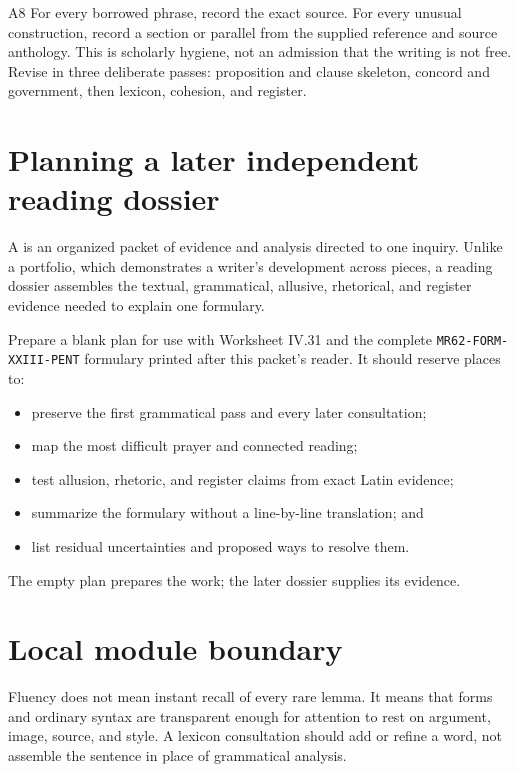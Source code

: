 \begin{courseunit}{A8}
For every borrowed phrase, record the exact source. For every unusual
construction, record a section or parallel from the supplied reference and
source anthology. This is scholarly hygiene, not an admission that the writing
is not free. Revise in three
deliberate passes: proposition and clause skeleton, concord and government,
then lexicon, cohesion, and register.

\section{Planning a later independent reading dossier}

A  is an organized packet of evidence and analysis directed to
one inquiry. Unlike a portfolio, which demonstrates a writer's development
across pieces, a reading dossier assembles the textual, grammatical, allusive,
rhetorical, and register evidence needed to explain one formulary.

Prepare a blank plan for use with Worksheet IV.31 and the complete
\texttt{MR62-FORM-XXIII-PENT} formulary printed after this packet's reader. It
should reserve places
to:

\begin{itemize}
  \item preserve the first grammatical pass and every later consultation;
  \item map the most difficult prayer and connected reading;
  \item test allusion, rhetoric, and register claims from exact Latin evidence;
  \item summarize the formulary without a line-by-line translation; and
  \item list residual uncertainties and proposed ways to resolve them.
\end{itemize}

The empty plan prepares the work; the later dossier supplies its evidence.

\section{Local module boundary}

Fluency does not mean instant recall of every rare lemma. It means that forms
and ordinary syntax are transparent enough for attention to rest on argument,
image, source, and style. A lexicon consultation should add or refine a word,
not assemble the sentence in place of grammatical analysis.


\end{courseunit}

